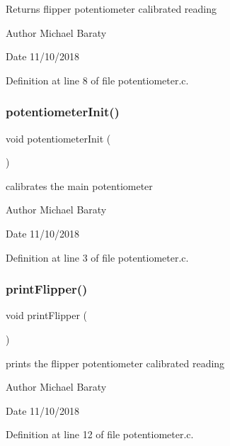 \begin{DoxyReturn}{Returns}
flipper potentiometer calibrated reading 
\end{DoxyReturn}
\begin{DoxyAuthor}{Author}
Michael Baraty 
\end{DoxyAuthor}
\begin{DoxyDate}{Date}
11/10/2018 
\end{DoxyDate}


Definition at line 8 of file potentiometer.\+c.

\mbox{\label{potentiometer_8c_a409cc2adce7e93d62c996f406cdf25b1}} 
\subsubsection{potentiometer\+Init()}
{\footnotesize\ttfamily void potentiometer\+Init (\begin{DoxyParamCaption}{ }\end{DoxyParamCaption})}



calibrates the main potentiometer 

\begin{DoxyAuthor}{Author}
Michael Baraty 
\end{DoxyAuthor}
\begin{DoxyDate}{Date}
11/10/2018 
\end{DoxyDate}


Definition at line 3 of file potentiometer.\+c.

\mbox{\label{potentiometer_8c_adaa13aa8239ccc6d7f3aa37bb4089e41}} 
\subsubsection{print\+Flipper()}
{\footnotesize\ttfamily void print\+Flipper (\begin{DoxyParamCaption}{ }\end{DoxyParamCaption})}



prints the flipper potentiometer calibrated reading 

\begin{DoxyAuthor}{Author}
Michael Baraty 
\end{DoxyAuthor}
\begin{DoxyDate}{Date}
11/10/2018 
\end{DoxyDate}


Definition at line 12 of file potentiometer.\+c.

